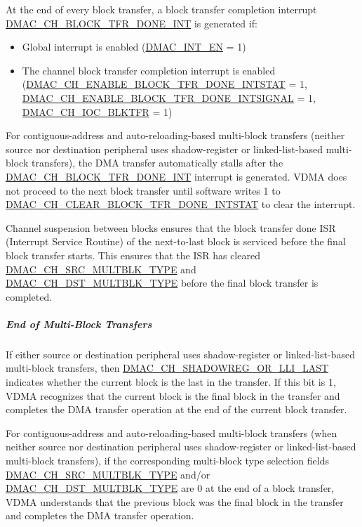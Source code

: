 \documentclass[main\_\_EN.tex]{subfiles}
\begin{document}
At the end of every block transfer, a block transfer completion interrupt \hyperref[int:DMACCHNBLOCKTFRDONEINT]{DMAC\_CH\_BLOCK\_TFR\_DONE\_INT} is generated if:

\begin{itemize}
    \item Global interrupt is enabled (\hyperref[fielddesc:DMACINTEN]{DMAC\_INT\_EN} = 1)
    \item The channel block transfer completion interrupt is enabled (\hyperref[fielddesc:DMACCHNENABLEBLOCKTFRDONEINTSTAT] {DMAC\_CH\_ENABLE\_BLOCK\_TFR\_DONE\_INTSTAT} = 1, \hyperref[fielddesc:DMACCHNENABLEBLOCKTFRDONEINTSIGNAL]{DMAC\_CH\_ENABLE\_BLOCK\_TFR\_DONE\_INTSIGNAL} = 1, \hyperref[fielddesc:DMACCHNIOCBLKTFR]{DMAC\_CH\_IOC\_BLKTFR} = 1)
\end{itemize}

For contiguous-address and auto-reloading-based multi-block transfers (neither source nor destination peripheral uses shadow-register or linked-list-based multi-block transfers), the DMA transfer automatically stalls after the \hyperref[int:DMACCHNBLOCKTFRDONEINT]{DMAC\_CH\_BLOCK\_TFR\_DONE\_INT} interrupt is generated. VDMA does not proceed to the next block transfer until software writes 1 to \hyperref[fielddesc:DMACCHNCLEARBLOCKTFRDONEINTSTAT]{DMAC\_CH\_CLEAR\_BLOCK\_TFR\_DONE\_INTSTAT} to clear the interrupt.

Channel suspension between blocks ensures that the block transfer done ISR (Interrupt Service Routine) of the next-to-last block is serviced before the final block transfer starts. This ensures that the ISR has cleared \hyperref[fielddesc:DMACCHNSRCMULTBLKTYPE]{DMAC\_CH\_SRC\_MULTBLK\_TYPE} and \hyperref[fielddesc:DMACCHNDSTMULTBLKTYPE]{DMAC\_CH\_DST\_MULTBLK\_TYPE} before the final block transfer is completed.

\subparagraph{End of Multi-Block Transfers}

If either source or destination peripheral uses shadow-register or linked-list-based multi-block transfers, then \hyperref[fielddesc:DMACCHNSHADOWREGORLLILAST] {DMAC\_CH\_SHADOWREG\_OR\_LLI\_LAST} indicates whether the current block is the last in the transfer. If this bit is 1, VDMA recognizes that the current block is the final block in the transfer and completes the DMA transfer operation at the end of the current block transfer.

For contiguous-address and auto-reloading-based multi-block transfers (when neither source nor destination peripheral uses shadow-register or linked-list-based multi-block transfers), if the corresponding multi-block type selection fields \hyperref[fielddesc:DMACCHNSRCMULTBLKTYPE]{DMAC\_CH\_SRC\_MULTBLK\_TYPE} and/or \hyperref[fielddesc:DMACCHNDSTMULTBLKTYPE]{DMAC\_CH\_DST\_MULTBLK\_TYPE} are 0 at the end of a block transfer, VDMA understands that the previous block was the final block in the transfer and completes the DMA transfer operation.
\end{document}
